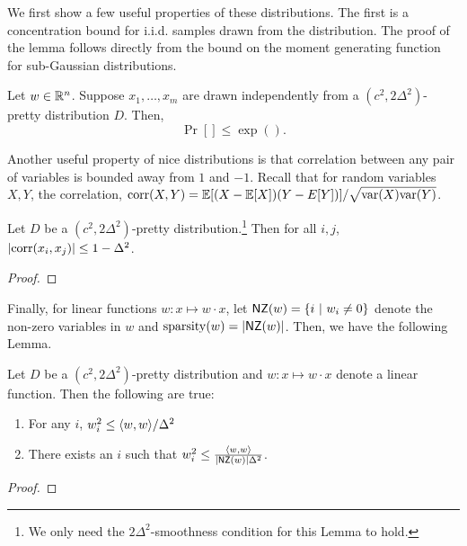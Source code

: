 We first show a few useful properties of these distributions. The first is a
concentration bound for i.i.d. samples drawn from the distribution. The proof of
the lemma follows directly from the bound on the moment generating function for
sub-Gaussian distributions.

\begin{lemma}
Let $w \in \mathbb{R}^n$. Suppose $x_1, \ldots, x_m$ are drawn independently from
a $(c^2, 2 \Delta^2)$-pretty distribution $D$. Then,
\[ 
\Pr[ ] \leq \exp( ).
\]
\end{lemma}

Another useful property of nice distributions is that correlation between any
pair of variables is bounded away from $1$ and $-1$.  Recall that for random
variables $X, Y$, the correlation, $\mathrm{corr}(X, Y) = \mathbb{E}[(X - \mathbb{E}[X]) (Y -
E[Y])]/\sqrt{\mathrm{var}(X) \mathrm{var}(Y)}$. 

\begin{lemma} Let $D$ be a $(c^2, 2 \Delta^2)$-pretty distribution.\footnote{We
only need the $2 \Delta^2$-smoothness condition for this Lemma to hold.} Then
for all $i, j$, $|\mathrm{corr}(x_i, x_j)| \leq 1 - \Delta^2$.
\end{lemma}
\begin{proof}

\end{proof}

Finally, for linear functions $w : x \mapsto w \cdot x$, let $\mathsf{NZ}(w) = \{ i ~|~
w_i \neq 0 \}$ denote the non-zero variables in $w$ and $\mathrm{sparsity}(w) =
|\mathsf{NZ}(w)|$. Then, we have the following Lemma.

\begin{lemma} Let $D$ be a $(c^2, 2 \Delta^2)$-pretty distribution and $w : x
\mapsto w \cdot x$ denote a linear function. Then the following are true:
\begin{enumerate}
\item For any $i$, $w^2_i \leq \langle w, w \rangle/\Delta^2$
\item There exists an $i$ such that $w^2_i \leq \frac{\langle w, w \rangle}{|\mathsf{NZ}(w)| \Delta^2}$.
\end{enumerate}
\end{lemma}
\begin{proof}

\end{proof}
